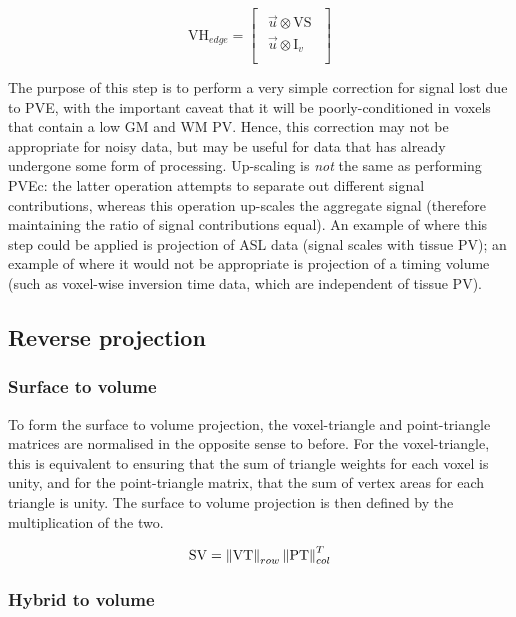 \begin{equation}
\mathrm{VH}_{edge} =  \begin{bmatrix}
    \begin{array}{c}
  \vec{u} \otimes \mathrm{VS}  \\
  \hline
  \vec{u} \otimes \mathrm{I}_v \\
    \end{array}
  \end{bmatrix}
\end{equation}

The purpose of this step is to perform a very simple correction for signal lost due to PVE, with the important caveat that it will be poorly-conditioned in voxels that contain a low GM and WM PV. Hence, this correction may not be appropriate for noisy data, but may be useful for data that has already undergone some form of processing. Up-scaling is \textit{not} the same as performing PVEc: the latter operation attempts to separate out different signal contributions, whereas this operation up-scales the aggregate signal (therefore maintaining the ratio of signal contributions equal). An example of where this step could be applied is projection of ASL data (signal scales with tissue PV); an example of where it would not be appropriate is projection of a timing volume (such as voxel-wise inversion time data, which are independent of tissue PV). 

\subsection{Reverse projection}

\subsubsection{Surface to volume}
To form the surface to volume projection, the voxel-triangle and point-triangle matrices are normalised in the opposite sense to before. For the voxel-triangle, this is equivalent to ensuring that the sum of triangle weights for each voxel is unity, and for the point-triangle matrix, that the sum of vertex areas for each triangle is unity. The surface to volume projection is then defined by the multiplication of the two.  

\begin{equation}
\mathrm{SV} =  \left\Vert \mathrm{VT} \right\Vert_{row} \left\Vert \mathrm{PT} \right\Vert_{col}^T
\end{equation}

\subsubsection{Hybrid to volume}

